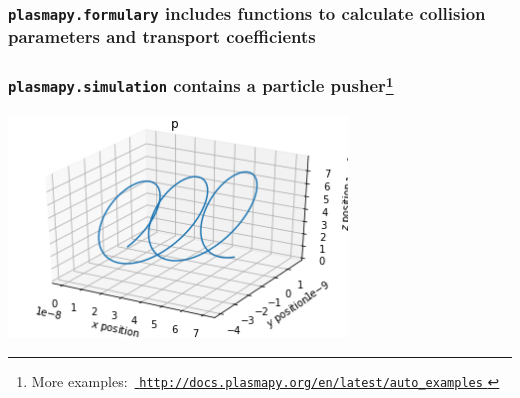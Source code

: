 \documentclass[default,compress]{beamer}
\begin{document}
\begin{frame}[plain]
    \frametitle{\texttt{plasmapy.formulary} includes functions to calculate collision parameters and transport coefficients}
    \classicaltransport
\end{frame}


\begin{frame}[plain]
    \frametitle{
        \texttt{plasmapy.simulation} contains a particle pusher\footnote{
            More examples:\
            \href{
                http://docs.plasmapy.org/en/latest/auto_examples
                }{
                    \texttt{http://docs.plasmapy.org/en/latest/auto\_examples}
            }
        }
    }
    \begin{center}
        \includegraphics[width=9cm]{ExB_example.png}
    \end{center}
\end{frame}
\end{document}
